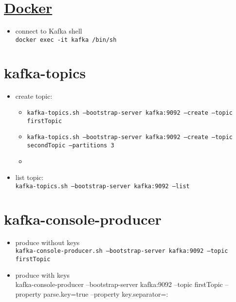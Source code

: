 \documentclass{article}
\begin{document}
\section{\href{https://towardsdatascience.com/how-to-install-apache-kafka-using-docker-the-easy-way-4ceb00817d8b}{Docker}}

\begin{itemize}
\item connect to Kafka shell\\
\texttt{docker exec -it kafka /bin/sh}
\end{itemize}

\section{kafka-topics}
\begin{itemize}
\item create topic:
\begin{itemize}
\item \texttt{kafka-topics.sh --bootstrap-server kafka:9092 --create --topic firstTopic}
\item \texttt{kafka-topics.sh --bootstrap-server kafka:9092 --create --topic secondTopic --partitions 3}
\item {}
\end{itemize}


\item list topic: \\
\texttt{kafka-topics.sh --bootstrap-server kafka:9092 --list}
\end{itemize}

\section{kafka-console-producer}
\begin{itemize}
\item produce without keys\\
\texttt{kafka-console-producer.sh --bootstrap-server kafka:9092 --topic firstTopic}
\item produce with keys\\
kafka-console-producer --bootstrap-server kafka:9092 --topic firstTopic --property parse.key=true --property key.separator=:
\end{itemize}
\end{document}
